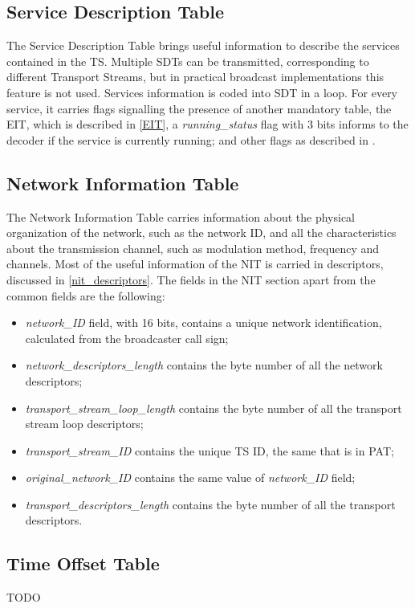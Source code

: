 \documentclass[
	12pt,				%
	openright,			%
	twoside,			%
	a4paper,			%
	brazil,
	french,				%
	english
	]{abntex2}
\begin{document}
\subsection{Service Description Table}
\label{SDT}
The Service Description Table brings useful information to describe the services contained in the TS. Multiple SDTs can be transmitted, corresponding to different Transport Streams, but in practical broadcast implementations this feature is not used. Services information is coded into SDT in a loop. For every service, it carries flags signalling the presence of another mandatory table, the EIT, which is described in \autoref{EIT}, a \textit{running\_status} flag with 3 bits informs to the decoder if the service is currently running; and other flags as described in .

\subsection{Network Information Table}
\label{NIT}
The Network Information Table carries information about the physical organization of the network, such as the network ID, and all the characteristics about the transmission channel, such as modulation method, frequency and channels. Most of the useful information of the NIT is carried in descriptors, discussed in \autoref{nit_descriptors}. The fields in the NIT section apart from the common fields are the following:
\begin{itemize}
\item{\textit{network\_ID} field, with 16 bits, contains a unique network identification, calculated from the broadcaster call sign;}
\item{\textit{network\_descriptors\_length} contains the byte number of all the network descriptors;}
\item{\textit{transport\_stream\_loop\_length} contains the byte number of all the transport stream loop descriptors;}
\item{\textit{transport\_stream\_ID} contains the unique TS ID, the same that is in PAT;}
\item{\textit{original\_network\_ID}  contains the same value of \textit{network\_ID} field;}
\item{\textit{transport\_descriptors\_length} contains the byte number of all the transport descriptors.}
\end{itemize}


\subsection{Time Offset Table}
\label{TOT}
TODO
\end{document}
